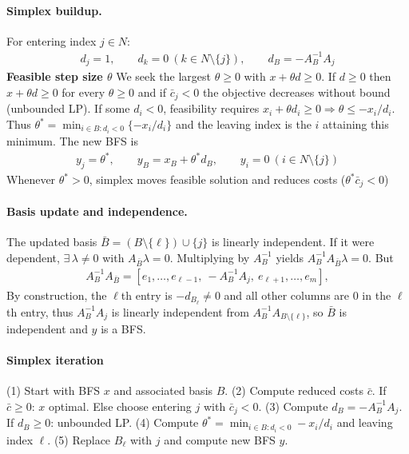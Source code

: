 \documentclass{article}
\begin{document}
\paragraph{Simplex buildup.} For entering index $j\in N$:
\begin{align*}
d_j = 1,\qquad d_k = 0\ (k\in N\setminus\{j\}),\qquad
d_B = -A_B^{-1}A_j
\tag{since $Ad = 0 \Rightarrow A_B d_B + A_j = 0$}
\end{align*}
\textbf{Feasible step size $\theta$} We seek the largest $\theta\ge0$ with $x+\theta d\ge0$.
If $d \ge 0$ then $x+\theta d\ge0$ for every $\theta\ge0$ and if $\bar c_j<0$ the objective decreases without bound (unbounded LP).
If some $d_i<0$, feasibility requires $x_i + \theta d_i \ge 0 \Rightarrow \theta \le -x_i/d_i$.
Thus $\theta^* = \min_{i\in B: d_i<0} \{-x_i/d_i\}$ and the leaving index is the $i$ attaining this minimum. The new BFS is
\begin{align*}
y_j = \theta^*,\qquad
y_B = x_B + \theta^* d_B,\qquad
y_i = 0\ (i\in N\setminus\{j\})
\end{align*}
Whenever $\theta^* > 0$, simplex moves feasible solution and reduces costs ($\theta^* \bar c_j < 0$)


\paragraph{Basis update and independence.}
The updated basis $\bar B = (B\setminus\{\ell\})\cup\{j\}$ is linearly independent.
If it were dependent, $\exists\,\lambda\neq0$ with $A_{\bar B}\lambda=0$.
Multiplying by $A_B^{-1}$ yields $A_B^{-1}A_{\bar B}\lambda=0$.
But
\begin{align*}
A_B^{-1}A_{\bar B} = 
[e_1,\dots,e_{\ell-1},\ -A_B^{-1}A_j,\ e_{\ell+1},\dots,e_m],
\end{align*}
By construction, the $\ell$th entry is $-d_{B_\ell} \neq 0$ and all other columns are 0 in the $\ell$th entry, thus $A_B^{-1}A_j$ is linearly independent from $A_B^{-1}A_{B\setminus\{\ell\}}$, so $\bar B$ is independent and $y$ is a BFS.

\paragraph{Simplex iteration} 
(1) Start with BFS $x$ and associated basis $B$. 
(2) Compute reduced costs $\bar c$. If $\bar c\ge0$: $x$ optimal. Else choose entering $j$ with $\bar c_j<0$.
(3) Compute $d_B = -A_B^{-1}A_j$. If $d_B\ge0$: unbounded LP.
(4) Compute $\theta^* = \min_{i\in B: d_i<0} -x_i/d_i$ and leaving index $\ell$.
(5) Replace $B_\ell$ with $j$ and compute new BFS $y$.
\end{document}
